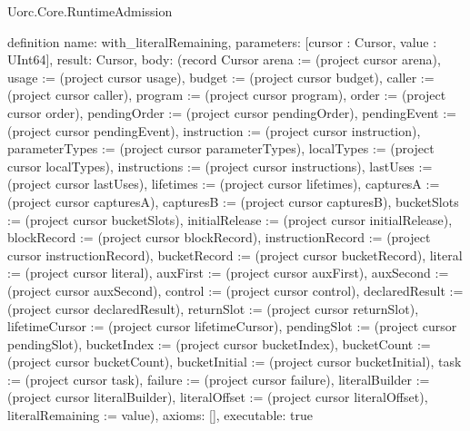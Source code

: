 \begin{lexlean}{Uorc.Core.RuntimeAdmission}
\begin{semanticmodule}
definition{
  name: with_literalRemaining,
  parameters: [cursor : Cursor, value : UInt64],
  result: Cursor,
  body: (record Cursor {arena := (project cursor arena), usage := (project cursor usage), budget := (project cursor budget), caller := (project cursor caller), program := (project cursor program), order := (project cursor order), pendingOrder := (project cursor pendingOrder), pendingEvent := (project cursor pendingEvent), instruction := (project cursor instruction), parameterTypes := (project cursor parameterTypes), localTypes := (project cursor localTypes), instructions := (project cursor instructions), lastUses := (project cursor lastUses), lifetimes := (project cursor lifetimes), capturesA := (project cursor capturesA), capturesB := (project cursor capturesB), bucketSlots := (project cursor bucketSlots), initialRelease := (project cursor initialRelease), blockRecord := (project cursor blockRecord), instructionRecord := (project cursor instructionRecord), bucketRecord := (project cursor bucketRecord), literal := (project cursor literal), auxFirst := (project cursor auxFirst), auxSecond := (project cursor auxSecond), control := (project cursor control), declaredResult := (project cursor declaredResult), returnSlot := (project cursor returnSlot), lifetimeCursor := (project cursor lifetimeCursor), pendingSlot := (project cursor pendingSlot), bucketIndex := (project cursor bucketIndex), bucketCount := (project cursor bucketCount), bucketInitial := (project cursor bucketInitial), task := (project cursor task), failure := (project cursor failure), literalBuilder := (project cursor literalBuilder), literalOffset := (project cursor literalOffset), literalRemaining := value}),
  axioms: [],
  executable: true
}


\end{semanticmodule}
\end{lexlean}
